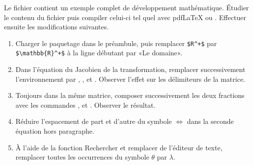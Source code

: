\begin{exercice}[nosol]
  Le fichier  contient un exemple
  complet de développement mathématique. Étudier le contenu du fichier
  puis compiler celui-ci tel quel avec {pdf\LaTeX} ou {\XeLaTeX}.
  Effectuer ensuite les modifications suivantes.
  \begin{enumerate}
  \item Charger le paquetage  dans le préambule, puis
    remplacer \verb=$R^+$= par \verb=$\mathbb{R}^+$= à la ligne
    débutant par «Le domaine».
  \item Dans l'équation du Jacobien de la transformation, remplacer
    successivement l'environnement  par %
    , %
    , %
     et %
    . Observer l'effet sur les délimiteurs de la matrice.
  \item Toujours dans la même matrice, composer successivement les
    deux fractions avec les commandes \cmd{\frac}, \cmd{\tfrac} et
    \cmd{\dfrac}. Observer le résultat.
  \item Réduire l'espacement de part et d'autre du symbole
    $\Leftrightarrow$ dans la seconde équation hors paragraphe.
  \item À l'aide de la fonction Rechercher et remplacer de l'éditeur
    de texte, remplacer toutes les occurrences du symbole $\theta$ par
    $\lambda$.
  \end{enumerate}
\end{exercice}


